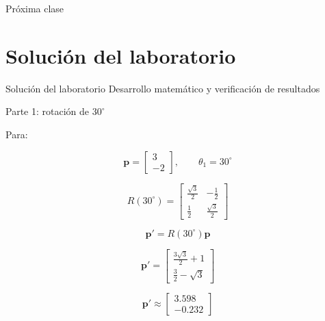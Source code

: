 \documentclass[aspectratio=169]{beamer}
\begin{document}
\begin{frame}{Próxima clase}


\end{frame}

\begin{frame}
    \centering
\end{frame}


\section{Solución del laboratorio}

\SectionSlide
{Solución del laboratorio}
{Desarrollo matemático y verificación de resultados}

\begin{frame}{Parte 1: rotación de \texorpdfstring{$30^\circ$}{30 grados}}

    Para:

    \[
    \mathbf{p}
    =
    \begin{bmatrix}
        3\\
        -2
    \end{bmatrix},
    \qquad
    \theta_1=30^\circ
    \]

    \[
    R(30^\circ)
    =
    \begin{bmatrix}
        \frac{\sqrt{3}}{2} & -\frac{1}{2}\\
        \frac{1}{2} & \frac{\sqrt{3}}{2}
    \end{bmatrix}
    \]

    \[
    \mathbf{p}'
    =
    R(30^\circ)\mathbf{p}
    \]

    \[
    \mathbf{p}'
    =
    \begin{bmatrix}
        \frac{3\sqrt{3}}{2}+1\\
        \frac{3}{2}-\sqrt{3}
    \end{bmatrix}
    \]

    \[
    \boxed{
        \mathbf{p}'
        \approx
        \begin{bmatrix}
            3.598\\
            -0.232
    \end{bmatrix}}
    \]

\end{frame}
\end{document}
